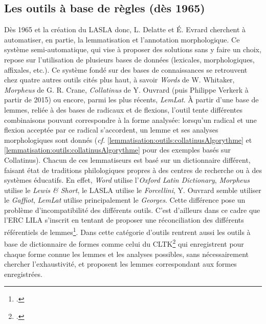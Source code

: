 \subsection{Les outils à base de règles (dès 1965)}

Dès 1965 et la création du LASLA donc, L. Delatte et É. Evrard cherchent à automatiser, en partie, la lemmatisation et l'annotation morphologique. Ce système semi-automatique, qui vise à proposer des solutions sans y faire un choix, repose sur l'utilisation de plusieurs bases de données (lexicales, morphologiques, affixales, etc.). Ce système fondé sur des bases de connaissances se retrouvent chez quatre autres outils cités plus haut, à savoir \textit{Words} de W. Whitaker, \textit{Morpheus} de G. R. Crane, \textit{Collatinus} de Y. Ouvrard (puis Philippe Verkerk à partir de 2015) ou encore, parmi les plus récents, \textit{LemLat}. À partir d'une base de lemmes, reliée à des bases de radicaux et de flexions, l'outil tente différentes combinaisons pouvant correspondre à la forme analysée: lorsqu'un radical et une flexion acceptée par ce radical s'accordent, un lemme et ses analyses morphologiques sont donnés (\textit{cf.} \ref{lemmatisation:outils:collatinusAlgorythme} et \ref{lemmatisation:outils:collatinusAlgorythme} pour des exemples basés sur Collatinus). Chacun de ces lemmatiseurs est basé sur un dictionnaire différent, faisant état de traditions philologiques propres à des centres de recherche ou à des systèmes éducatifs. En effet, \textit{Word} utilise l'\textit{Oxford Latin Dictionary}, \textit{Morpheus} utilise le \textit{Lewis \& Short}, le LASLA utilise le \textit{Forcellini}, Y. Ouvrard semble utiliser le \textit{Gaffiot}, \textit{LemLat} utilise principalement le \textit{Georges}. Cette différence pose un problème d'incompatibilité des différents outils. C'est d'ailleurs dans ce cadre que l'ERC LILA s'inscrit en tentant de proposer une réconciliation des différents référentiels de lemmes\footcite{mambrini_harmonizing_2019}. Dans cette catégorie d'outils rentrent aussi les outils à base de dictionnaire de formes comme celui du CLTK\footcite{johnson2014cltk} qui enregistrent pour chaque forme connue les lemmes et les analyses possibles, sans nécessairement chercher l'exhaustivité, et proposent les lemmes correspondant aux formes enregistrées.

